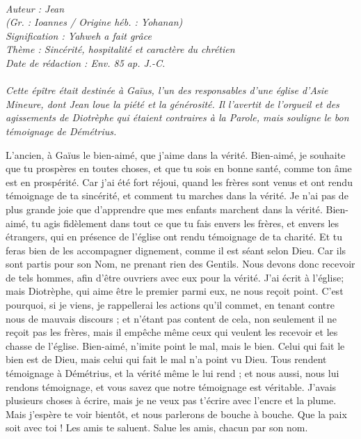 \BFont
\noindent\hrulefill
{\footnotesize
\textit{
\bigskip
{\centering{}
\\Auteur : Jean
\\(Gr. : Ioannes / Origine héb. : Yohanan)
\\Signification : Yahweh a fait grâce
\\Thème : Sincérité, hospitalité et caractère du chrétien
\\Date de rédaction : Env. 85 ap. J.-C.\\}
}
\textit{
\\Cette épître était destinée à Gaïus, l'un des responsables d'une église d'Asie Mineure, dont Jean loue la piété et la générosité. Il l'avertit de l'orgueil et des agissements de Diotrèphe qui étaient contraires à la Parole, mais souligne le bon témoignage de Démétrius.\bigskip
}
}
\par\nobreak\noindent\hrulefill
\begin{multicols}{2}
\VerseOne{}L'ancien, à Gaïus le bien-aimé, que j'aime dans la vérité.
Bien-aimé, je souhaite que tu prospères en toutes choses, et que tu sois en bonne santé, comme ton âme est en prospérité.
Car j'ai été fort réjoui, quand les frères sont venus et ont rendu témoignage de ta sincérité, et comment tu marches dans la vérité.
Je n'ai pas de plus grande joie que d'apprendre que mes enfants marchent dans la vérité.
Bien-aimé, tu agis fidèlement dans tout ce que tu fais envers les frères, et envers les étrangers,
qui en présence de l'église ont rendu témoignage de ta charité. Et tu feras bien de les accompagner dignement, comme il est séant selon Dieu.
Car ils sont partis pour son Nom, ne prenant rien des Gentils.
Nous devons donc recevoir de tels hommes, afin d'être ouvriers avec eux pour la vérité.
J'ai écrit à l'église; mais Diotrèphe, qui aime être le premier parmi eux, ne nous reçoit point.
C'est pourquoi, si je viens, je rappellerai les actions qu'il commet, en tenant contre nous de mauvais discours ; et n'étant pas content de cela, non seulement il ne reçoit pas les frères, mais il empêche même ceux qui veulent les recevoir et les chasse de l'église.
Bien-aimé, n'imite point le mal, mais le bien. Celui qui fait le bien est de Dieu, mais celui qui fait le mal n'a point vu Dieu.
Tous rendent témoignage à Démétrius, et la vérité même le lui rend ; et nous aussi, nous lui rendons témoignage, et vous savez que notre témoignage est véritable.
J'avais plusieurs choses à écrire, mais je ne veux pas t'écrire avec l'encre et la plume.
Mais j'espère te voir bientôt, et nous parlerons de bouche à bouche.
Que la paix soit avec toi ! Les amis te saluent. Salue les amis, chacun par son nom.
\PPE{}
\end{multicols}
